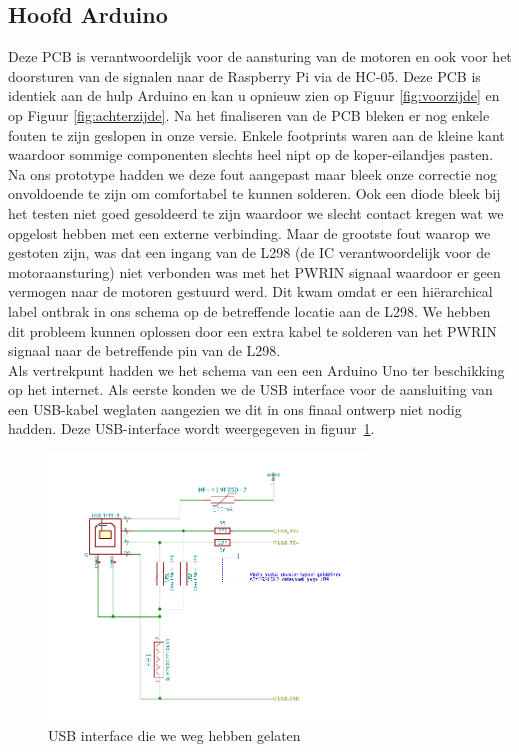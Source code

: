 \subsection{Hoofd Arduino}
Deze PCB is verantwoordelijk voor de aansturing van de motoren en ook voor het doorsturen van de signalen naar de Raspberry Pi via de HC-05. Deze PCB is identiek aan de hulp Arduino en kan u opnieuw zien op Figuur \ref{fig:voorzijde} en op Figuur \ref{fig:achterzijde}. Na het finaliseren van de PCB bleken er nog enkele fouten te zijn geslopen in onze versie. Enkele footprints waren aan de kleine kant waardoor sommige componenten slechts heel nipt op de koper-eilandjes pasten. Na ons prototype hadden we deze fout aangepast maar bleek onze correctie nog onvoldoende te zijn om comfortabel te kunnen solderen. Ook een diode bleek bij het testen niet goed gesoldeerd te zijn waardoor we slecht contact kregen wat we opgelost hebben met een externe verbinding. Maar de grootste fout waarop we gestoten zijn, was dat een ingang van de L298 (de IC verantwoordelijk voor de motoraansturing) niet verbonden was met het PWRIN signaal waardoor er geen vermogen naar de motoren gestuurd werd. Dit kwam omdat er een hi\"erarchical label ontbrak in ons schema op de betreffende locatie aan de L298. We hebben dit probleem kunnen oplossen door een extra kabel te solderen van het PWRIN signaal naar de betreffende pin van de L298. \\
Als vertrekpunt hadden we het schema van een een Arduino Uno ter beschikking op het internet. Als eerste konden we de USB interface voor de aansluiting van een USB-kabel weglaten aangezien we dit in ons finaal ontwerp niet nodig hadden. Deze USB-interface wordt weergegeven in figuur~\ref{fig:USB-interface}.
\begin{figure}[h]
\centering
\includegraphics[width=0.75\textwidth]{USB_Interface.png}
\caption{USB interface die we weg hebben gelaten}
\label{fig:USB-interface}
\end{figure}
